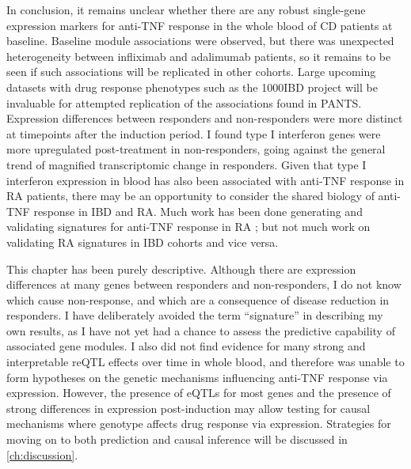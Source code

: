In conclusion,
it remains unclear whether there are any robust single-gene expression markers for anti-\gls{TNF} response in the whole blood of \gls{CD} patients at baseline.
Baseline module associations were observed, but there was unexpected heterogeneity between infliximab and adalimumab patients,
so it remains to be seen if such associations will be replicated in other cohorts.
Large upcoming datasets with drug response phenotypes such as the 1000IBD project \autocite{imhann20191000IBDProjectMultiomics} will be invaluable for attempted replication of the associations found in \gls{PANTS}.
Expression differences between responders and non-responders were more distinct at timepoints after the induction period.
I found type I interferon genes were more upregulated post-treatment in non-responders,
going against the general trend of magnified transcriptomic change in responders.
Given that type I interferon expression in blood has also been associated with anti-\gls{TNF} response in \gls{RA} patients,
there may be an opportunity to consider the shared biology of anti-\gls{TNF} response in \gls{IBD} and \gls{RA}.
Much work has been done generating and validating signatures for anti-\gls{TNF} response in \gls{RA} \autocite{toonen2012ValidationStudyExisting}; but not much work on validating \gls{RA} signatures in \gls{IBD} cohorts and vice versa.

This chapter has been purely descriptive.
Although there are expression differences at many genes between responders and non-responders,
I do not know which cause non-response,
and which are a consequence of disease reduction in responders.
I have deliberately avoided the term \enquote{signature} in describing my own results, 
as I have not yet had a chance to assess the predictive capability of associated gene modules.
I also did not find evidence for many strong and interpretable \gls{reQTL} effects over time in whole blood, 
and therefore was unable to form hypotheses on the genetic mechanisms influencing anti-\gls{TNF} response via expression.
However, the presence of \glspl{eQTL} for most genes and the presence of strong differences in expression post-induction may allow testing for causal mechanisms where genotype affects drug response via expression.
Strategies for moving on to both prediction and causal inference will be discussed in \cref{ch:discussion}.
%
